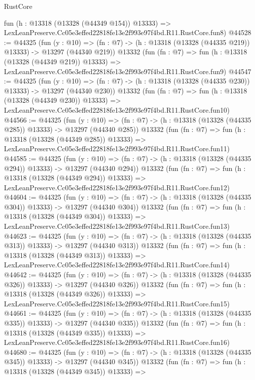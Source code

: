 \begin{lexlean}{RustCore}
\begin{coremodule}
    fun (h : @13318 (@13328 (@44349 @154)) @13333) =>
    LexLeanPreserve.Cc05e3effed22818fe13e2f993e97f4bd.R11.RustCore.fun8)
@44528 := @44325
    (fun (y : @10) =>
    (fn : @7) -> (h : @13318 (@13328 (@44335 @219)) @13333) -> @13297 (@44340 @219))
    @13332
    (fun (fn : @7) =>
    fun (h : @13318 (@13328 (@44349 @219)) @13333) =>
    LexLeanPreserve.Cc05e3effed22818fe13e2f993e97f4bd.R11.RustCore.fun9)
@44547 := @44325
    (fun (y : @10) =>
    (fn : @7) -> (h : @13318 (@13328 (@44335 @230)) @13333) -> @13297 (@44340 @230))
    @13332
    (fun (fn : @7) =>
    fun (h : @13318 (@13328 (@44349 @230)) @13333) =>
    LexLeanPreserve.Cc05e3effed22818fe13e2f993e97f4bd.R11.RustCore.fun10)
@44566 := @44325
    (fun (y : @10) =>
    (fn : @7) -> (h : @13318 (@13328 (@44335 @285)) @13333) -> @13297 (@44340 @285))
    @13332
    (fun (fn : @7) =>
    fun (h : @13318 (@13328 (@44349 @285)) @13333) =>
    LexLeanPreserve.Cc05e3effed22818fe13e2f993e97f4bd.R11.RustCore.fun11)
@44585 := @44325
    (fun (y : @10) =>
    (fn : @7) -> (h : @13318 (@13328 (@44335 @294)) @13333) -> @13297 (@44340 @294))
    @13332
    (fun (fn : @7) =>
    fun (h : @13318 (@13328 (@44349 @294)) @13333) =>
    LexLeanPreserve.Cc05e3effed22818fe13e2f993e97f4bd.R11.RustCore.fun12)
@44604 := @44325
    (fun (y : @10) =>
    (fn : @7) -> (h : @13318 (@13328 (@44335 @304)) @13333) -> @13297 (@44340 @304))
    @13332
    (fun (fn : @7) =>
    fun (h : @13318 (@13328 (@44349 @304)) @13333) =>
    LexLeanPreserve.Cc05e3effed22818fe13e2f993e97f4bd.R11.RustCore.fun13)
@44623 := @44325
    (fun (y : @10) =>
    (fn : @7) -> (h : @13318 (@13328 (@44335 @313)) @13333) -> @13297 (@44340 @313))
    @13332
    (fun (fn : @7) =>
    fun (h : @13318 (@13328 (@44349 @313)) @13333) =>
    LexLeanPreserve.Cc05e3effed22818fe13e2f993e97f4bd.R11.RustCore.fun14)
@44642 := @44325
    (fun (y : @10) =>
    (fn : @7) -> (h : @13318 (@13328 (@44335 @326)) @13333) -> @13297 (@44340 @326))
    @13332
    (fun (fn : @7) =>
    fun (h : @13318 (@13328 (@44349 @326)) @13333) =>
    LexLeanPreserve.Cc05e3effed22818fe13e2f993e97f4bd.R11.RustCore.fun15)
@44661 := @44325
    (fun (y : @10) =>
    (fn : @7) -> (h : @13318 (@13328 (@44335 @335)) @13333) -> @13297 (@44340 @335))
    @13332
    (fun (fn : @7) =>
    fun (h : @13318 (@13328 (@44349 @335)) @13333) =>
    LexLeanPreserve.Cc05e3effed22818fe13e2f993e97f4bd.R11.RustCore.fun16)
@44680 := @44325
    (fun (y : @10) =>
    (fn : @7) -> (h : @13318 (@13328 (@44335 @345)) @13333) -> @13297 (@44340 @345))
    @13332
    (fun (fn : @7) =>
    fun (h : @13318 (@13328 (@44349 @345)) @13333) =>

\end{coremodule}
\end{lexlean}
